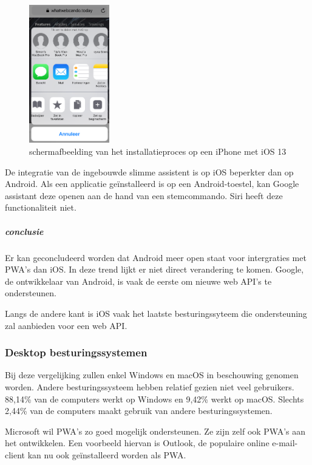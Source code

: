 		
		\begin{figure}[H]
			\centering
			\includegraphics[width=35mm]{./img/installation_iOS.png}
			\caption{schermafbeelding van het installatieproces op een iPhone met iOS 13}
			\label{A2HSExperienceIOS}
		\end{figure}
		
		De integratie van de ingebouwde slimme assistent is op iOS beperkter dan op Android. Als een applicatie geïnstalleerd is op een Android-toestel, kan Google assistant deze openen aan de hand van een stemcommando. Siri heeft deze functionaliteit niet.
		\autocite{Lathiya2020}
		
		\newpage
		\subparagraph{conclusie}
		
			Er kan geconcludeerd worden dat Android meer open staat voor intergraties met PWA's dan iOS. In deze trend lijkt er niet direct verandering te komen. Google, de ontwikkelaar van Android, is vaak de eerste om nieuwe web API's te ondersteunen.
			
			Langs de andere kant is iOS vaak het laatste besturingssyteem die ondersteuning zal aanbieden voor een web API.
	
	
	\subsubsection{Desktop besturingssystemen}
		Bij deze vergelijking zullen enkel Windows en macOS in beschouwing genomen worden. Andere besturingssysteem hebben relatief gezien niet veel gebruikers. 88,14\% van de computers werkt op Windows en 9,42\% werkt op macOS. Slechts 2,44\% van de computers maakt gebruik van andere besturingssystemen.
		\autocite{netMarketShare2020}
		
		Microsoft wil PWA's zo goed mogelijk ondersteunen. Ze zijn zelf ook PWA's aan het ontwikkelen. Een voorbeeld hiervan is Outlook, de populaire online e-mail-client kan nu ook geïnstalleerd worden als PWA.
		\autocite{Microsoft2020a}
		
